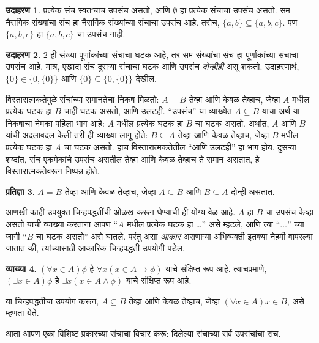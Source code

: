 \documentclass[11pt,a4paper,openany]{book}
\theoremstyle{definition}
\newtheorem{defn}{व्याख्या}[section]
\newtheorem{ex}[defn]{उदाहरण}
\newtheorem{prop}[defn]{प्रतिज्ञा}
\newcommand{\lif}{\mathbin{\to}}
\begin{document}
\begin{ex}
प्रत्येक संच स्वतःचाच उपसंच असतो, आणि $\emptyset$ हा प्रत्येक संचाचा उपसंच असतो.
सम नैसर्गिक संख्यांचा संच हा नैसर्गिक संख्यांच्या संचाचा उपसंच आहे.
तसेच, $\{ a, b \} \subseteq \{ a, b, c \}$.
पण $\{ a, b, e
\}$ हा $\{ a, b, c \}$ चा उपसंच नाही.
\end{ex}

\begin{ex}
$2$ ही संख्या पूर्णांकांच्या संचाचा घटक आहे, तर सम संख्यांचा संच
हा पूर्णांकांच्या संचाचा उपसंच आहे. मात्र, एखादा संच दुसऱ्या संचाचा
घटक आणि उपसंच \emph{दोन्हीही} असू शकतो. उदाहरणार्थ,
$\{0\} \in \{0, \{0\}\}$ आणि $\{0\} \subseteq \{0,
\{0\}\}$ देखील.
\end{ex}

विस्तारात्मकतेमुळे संचांच्या समानतेचा निकष मिळतो: $A = B$ तेव्हा आणि केवळ तेव्हाच,
जेव्हा $A$ मधील प्रत्येक घटक हा $B$ चाही घटक असतो, आणि उलटही.
``उपसंच'' या व्याख्येत $A \subseteq B$ याचा अर्थ या निकषाचा नेमका पहिला
भाग आहे: $A$ मधील प्रत्येक घटक हा $B$ चा घटक असतो.
अर्थात, $A$ आणि $B$ यांची अदलाबदल केली तरी ही व्याख्या लागू होते:
$B \subseteq A$ तेव्हा आणि केवळ तेव्हाच, जेव्हा $B$ मधील प्रत्येक घटक
हा $A$ चा घटक असतो. हाच विस्तारात्मकतेतील ``आणि उलटही'' हा भाग होय.
दुसऱ्या शब्दांत, संच एकमेकांचे उपसंच असतील तेव्हा आणि केवळ तेव्हाच ते समान
असतात, हे विस्तारात्मकतेवरून निष्पन्न होते.

\begin{prop}
$A = B$ तेव्हा आणि केवळ तेव्हाच, जेव्हा $A \subseteq B$ आणि $B \subseteq A$ दोन्ही असतात.
\end{prop}

आणखी काही उपयुक्त चिन्हपद्धतींची ओळख करून घेण्याची ही योग्य वेळ आहे.
$A$ हा $B$ चा उपसंच केव्हा असतो याची व्याख्या करताना आपण
``$A$ मधील प्रत्येक घटक हा \dots'' असे म्हटले, आणि त्या
``$\dots$'' च्या जागी ``$B$ चा घटक असतो'' असे घातले.
परंतु असा \emph{आकार} असणाऱ्या अभिव्यक्ती इतक्या नेहमी वापरल्या जातात की,
त्यांच्यासाठी आकारिक चिन्हपद्धती उपयोगी पडेल.

\begin{defn}\label{sfr:set:sub:forallxina}
$(\forall x \in A)\phi$ हे $\forall x(x \in A \lif
\phi)$ याचे संक्षिप्त रूप आहे. त्याचप्रमाणे, $(\exists x \in A)\phi$ हे
$\exists x(x
\in A \land \phi)$ याचे संक्षिप्त रूप आहे.
\end{defn}

या चिन्हपद्धतीचा उपयोग करून, $A \subseteq B$ तेव्हा आणि केवळ तेव्हाच, जेव्हा
$(\forall
x \in A)x \in B$, असे म्हणता येते.

आता आपण एका विशिष्ट प्रकारच्या संचाचा विचार करू: दिलेल्या संचाच्या सर्व
उपसंचांचा संच.
\end{document}
